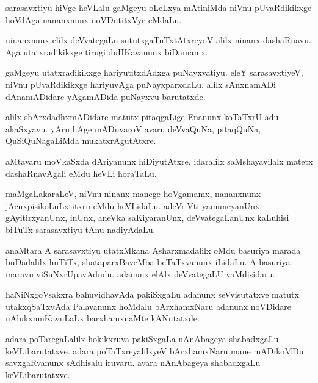\documentclass{article}
\begin{document}
\begin{mn}
sarasavxtiyu  hiVge  heVLalu  gaMgeyu  oLeLxya  mAtiniMda  niVnu  pUvaRdikikxge  
hoVdAga  nananxnunx  noVDutitxVye  eMdaLu.
\end{mn}

\begin{mn}
ninanxnunx  elilx  deVvategaLu  sututxgaTuTxtAtxreyoV  alilx  ninanx  dashaRnavu.  
Aga  utatxradikikxge  tirugi  duHKavanunx  biDamamx.
\end{mn}

\begin{mn}
gaMgeyu  utatxradikikxge  hariyutitxdAdxga  puNayxvatiyu.  eleY  sarasavxtiyeV,  
niVnu  pUvaRdikikxge  hariyuvAga  puNayxparxdaLu.  alilx  sAnxnamADi  
dAnamADidare  yAgamADida  puNayxvu  barutatxde.
\end{mn}

\begin{mn}
alilx  shArxdadhxmADidare  matutx  pitaqgaLige  Enanunx  koTaTxrU  adu  akaSxyavu.  
yAru  hAge  mADuvaroV  avaru  deVvaQuNa,  pitaqQuNa,  QuSiQuNagaLiMda  mukatxrAgutAtxre.
\end{mn}

\begin{mn}
aMtavaru  moVkaSxda  dAriyanunx  hiDiyutAtxre.  idaralilx  saMshayavilalx  
matetx  dashaRnavAgali  eMdu  heVLi  horaTaLu.
\end{mn}

\begin{mn}
maMgaLakaraLeV, niVnu  ninanx  manege  hoVgamamx,  nananxnunx  jAcnxpisikoLuLxtitxru  
eMdu  heVLidaLu.  adeVriVti  yamuneyanUnx,  gAyitirxyanUnx,  inUnx,  aneVka  
saKiyaranUnx,  deVvategaLanUnx  kaLuhisi biTuTx  sarasavxtiyu  tAnu  nadiyAdaLu.  
\end{mn}

\begin{mn}
anaMtara  A  sarasavxtiyu  utatxMkana  Asharxmadalilx  oMdu  basuriya  marada  
buDadalilx  huTiTx,  shataparxBaveMba  beTaTxvanunx  iLidaLu.  A  
basuriya  maravu  viSuNxrUpavAdudu.  adanunx  elAlx  deVvategaLU  vaMdisidaru.
\end{mn}

\begin{mn}
haNiNxgoVsakxra  bahuvidhavAda  pakiSxgaLu  adanunx  seVvisutatxve  matutx  utakxqSaTxvAda  
Palavanunx  hoMdalu  bArxhamxNaru  adanunx  noVDidare  nAlukxmuKavuLaLx  barxhamxnaMte  kANutatxde.
\end{mn}

\begin{mn}
adara  poTaregaLalilx  hokikxruva  pakiSxgaLa  nAnAbageya  shabadxgaLu  keVLibarutatxve.  
adara  poTaTxreyalilxyeV  bArxhamxNaru  mane  mADikoMDu  savxgaRvanunx  sAdhisalu  
iruvaru.  avara  nAnAbageya  shabadxgaLu  keVLibarutatxve.
\end{mn}
\end{document}
